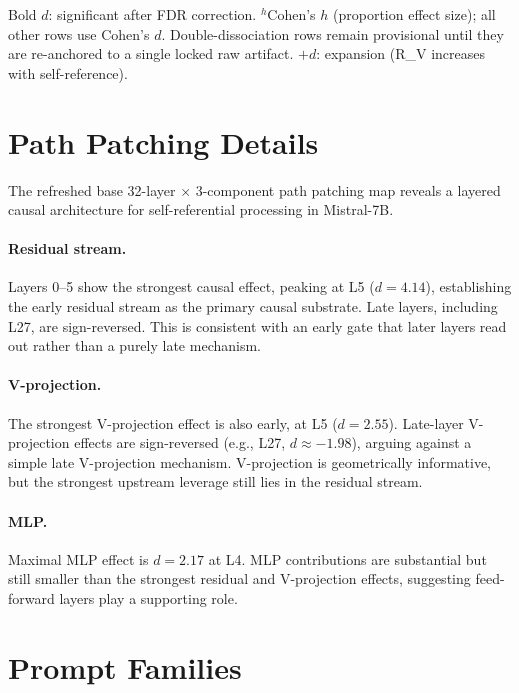 \documentclass{article}
\newcommand{\dcohen}{d}
\begin{document}
\begin{table}[ht]
\raggedright\footnotesize
Bold $\dcohen$: significant after FDR correction.
$^{h}$Cohen's $h$ (proportion effect size); all other rows use Cohen's $d$.
Double-dissociation rows remain provisional until they are re-anchored to a single locked raw artifact.
$+d$: expansion (R\_V increases with self-reference).
\end{table}


\section{Path Patching Details}
\label{app:pathpatch}

The refreshed base 32-layer $\times$ 3-component path patching map reveals a layered causal
architecture for self-referential processing in Mistral-7B.

\paragraph{Residual stream.}
Layers 0--5 show the strongest causal effect, peaking at L5
($\dcohen = 4.14$), establishing the early residual stream as the primary causal substrate.
Late layers, including L27, are sign-reversed.
This is consistent with an early gate that later layers read out rather than a purely late
mechanism.

\paragraph{V-projection.}
The strongest V-projection effect is also early, at L5 ($\dcohen = 2.55$).
Late-layer V-projection effects are sign-reversed (e.g., L27, $\dcohen \approx -1.98$),
arguing against a simple late V-projection mechanism.
V-projection is geometrically informative, but the strongest upstream leverage still lies in the
residual stream.

\paragraph{MLP.}
Maximal MLP effect is $\dcohen = 2.17$ at L4. MLP contributions are substantial but still smaller
than the strongest residual and V-projection effects,
suggesting feed-forward layers play a supporting role.


\section{Prompt Families}
\label{app:prompts}
\end{document}
